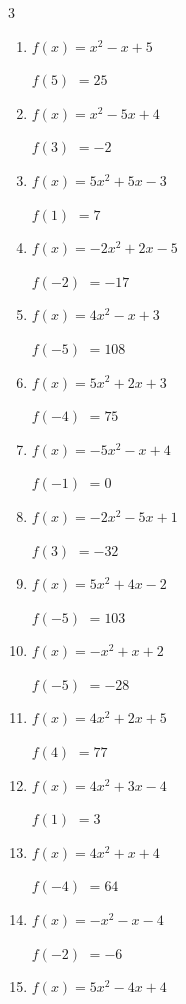 \begin{multicols}{3}
\begin{enumerate}
$f(2)$
        $= 4$

\columnbreak %

  \item $f(x)=x^{2}-x+5$

$f(5)$
        $= 25$

  \item $f(x)=x^{2}-5x+4$

$f(3)$
        $= -2$

  \item $f(x)=5x^{2}+5x-3$

$f(1)$
        $= 7$

  \item $f(x)=-2x^{2}+2x-5$

$f(-2)$
        $= -17$

  \item $f(x)=4x^{2}-x+3$

$f(-5)$
        $= 108$

  \item $f(x)=5x^{2}+2x+3$

$f(-4)$
        $= 75$

  \item $f(x)=-5x^{2}-x+4$

$f(-1)$
        $= 0$

  \item $f(x)=-2x^{2}-5x+1$

$f(3)$
        $= -32$

  \item $f(x)=5x^{2}+4x-2$

$f(-5)$
        $= 103$

  \item $f(x)=-x^{2}+x+2$

$f(-5)$
        $= -28$

  \item $f(x)=4x^{2}+2x+5$

$f(4)$
        $= 77$

  \item $f(x)=4x^{2}+3x-4$

$f(1)$
        $= 3$

  \item $f(x)=4x^{2}+x+4$

$f(-4)$
        $= 64$

  \item $f(x)=-x^{2}-x-4$

$f(-2)$
        $= -6$

  \item $f(x)=5x^{2}-4x+4$


\end{enumerate}
\end{multicols}
